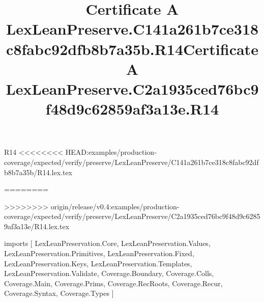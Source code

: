 \begin{lexlean}{R14}
<<<<<<<< HEAD:examples/production-coverage/expected/verify/preserve/LexLeanPreserve/C141a261b7ce318c8fabc92dfb8b7a35b/R14.lex.tex
\title{Certificate A LexLeanPreserve.C141a261b7ce318c8fabc92dfb8b7a35b.R14}
========
\title{Certificate A LexLeanPreserve.C2a1935ced76bc9f48d9c62859af3a13e.R14}
>>>>>>>> origin/release/v0.4:examples/production-coverage/expected/verify/preserve/LexLeanPreserve/C2a1935ced76bc9f48d9c62859af3a13e/R14.lex.tex
\begin{coremodule}
imports [
  LexLeanPreservation.Core,
  LexLeanPreservation.Values,
  LexLeanPreservation.Primitives,
  LexLeanPreservation.Fixed,
  LexLeanPreservation.Keys,
  LexLeanPreservation.Templates,
  LexLeanPreservation.Validate,
  Coverage.Boundary,
  Coverage.Colls,
  Coverage.Main,
  Coverage.Prims,
  Coverage.RecRoots,
  Coverage.Recur,
  Coverage.Syntax,
  Coverage.Types
]


\end{coremodule}
\end{lexlean}
